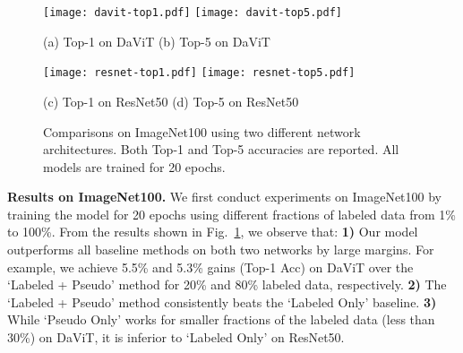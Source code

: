 


\begin{figure}[t]
  \texttt{[image: davit-top1.pdf]}\hfill
  \texttt{[image: davit-top5.pdf]}
  
  \vspace{-3pt} \small{\hspace{70pt} (a) Top-1 on DaViT \hspace{125pt} (b) Top-5 on DaViT}
  
  \texttt{[image: resnet-top1.pdf]}\hfill
  \texttt{[image: resnet-top5.pdf]}

  \vspace{-3pt} \small{\hspace{63pt} (c) Top-1 on ResNet50 \hspace{115pt} (d) Top-5 on ResNet50}
  \vspace{-0.05in}
  \caption{Comparisons on ImageNet100 using two different network architectures. Both Top-1 and Top-5 accuracies are reported. All models are trained for 20 epochs.
  }
  \label{fig:classification_fraction}
  \vspace{-12pt}
\end{figure}


\noindent \textbf{Results on ImageNet100.} 
We first conduct experiments on ImageNet100 by training the model for 20 epochs using different fractions of labeled data from 1\% to 100\%.
From the results shown in Fig.~\ref{fig:classification_fraction}, we observe that: \textbf{1)} Our model outperforms all baseline methods on both two networks by large margins.
For example, we achieve 5.5\% and 5.3\% gains (Top-1 Acc) on DaViT over the `Labeled + Pseudo' method for 20\% and 80\% labeled data, respectively.
\textbf{2)} The `Labeled + Pseudo' method consistently beats the `Labeled Only' baseline.
\textbf{3)} While `Pseudo Only' works for smaller fractions of the labeled data (less than 30\%) on DaViT, it is inferior to `Labeled Only' on ResNet50.


